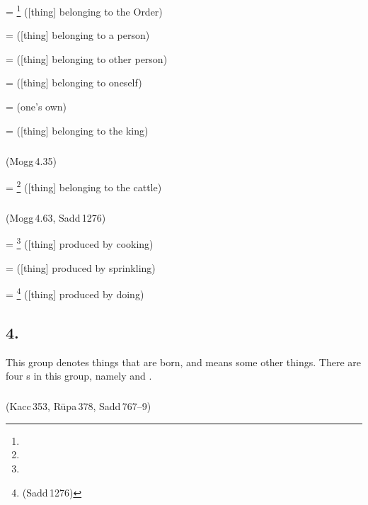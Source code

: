  = \footnote{} ([thing] belonging to the Order) \par
{} =  ([thing] belonging to a person) \par
{} =  ([thing] belonging to other person) \par
{} =  ([thing] belonging to oneself) \par
{} =  (one's own) \par
{} =  ([thing] belonging to the king) \par

\subparagraph*{} (Mogg\,4.35)\label{pacct3:ya}

 = \footnote{} ([thing] belonging to the cattle) \par

\subparagraph*{} (Mogg\,4.63, Sadd\,1276)\label{pacct3:ima}

 = \footnote{} ([thing] produced by cooking) \par
{} =  ([thing] produced by sprinkling) \par
{} = \footnote{ (Sadd\,1276)} ([thing] produced by doing) \par

\subsection*{4.\ }\label{tadgroup4}

This group denotes things that are born, and means some other things. There are four s in this group, namely  and .

\subparagraph*{} (Kacc\,353, R\=upa\,378, Sadd\,767--9)\label{pacct4:ima}\label{pacct4:iya}\label{pacct4:ika}\label{pacct4:kiya}

